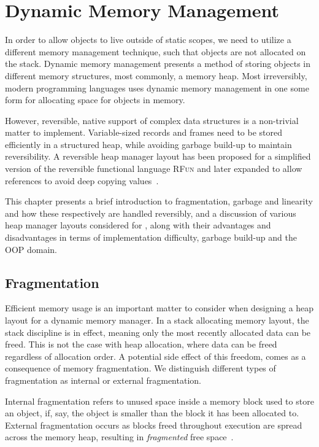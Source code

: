 \chapter{Dynamic Memory Management}
\label{chp:dynamic-memory-management}
In order to allow objects to live outside of static scopes, we need to utilize a different memory management technique, such that objects are not allocated on the stack. Dynamic memory management presents a method of storing objects in different memory structures, most commonly, a memory heap. Most irreversibly, modern programming languages uses dynamic memory management in one some form for allocating space for objects in memory. 

However, reversible, native support of complex data structures is a non-trivial matter to implement. Variable-sized records and frames need to be stored efficiently in a structured heap, while avoiding garbage build-up to maintain reversibility. A reversible heap manager layout has been proposed for a simplified version of the reversible functional language \textsc{RFun} and later expanded to allow references to avoid deep copying values~\cite{ha:heap, ty:rfun, tm:refcounting}.

This chapter presents a brief introduction to fragmentation, garbage and linearity and how these respectively are handled reversibly, and a discussion of various heap manager layouts considered for \rooplpp, along with their advantages and disadvantages in terms of implementation difficulty, garbage build-up and the OOP domain. 


\section{Fragmentation}
\label{sec:fragmentation}
Efficient memory usage is an important matter to consider when designing a heap layout for a dynamic memory manager. In a stack allocating memory layout, the stack discipline is in effect, meaning only the most recently allocated data can be freed. This is not the case with heap allocation, where data can be freed regardless of allocation order. A potential side effect of this freedom, comes as a consequence of memory fragmentation. We distinguish different types of fragmentation as internal or external fragmentation. 

Internal fragmentation refers to unused space inside a memory block used to store an object, if, say, the object is smaller than the block it has been allocated to. External fragmentation occurs as blocks freed throughout execution are spread across the memory heap, resulting in \textit{fragmented} free space~\cite{tm:languages}.

